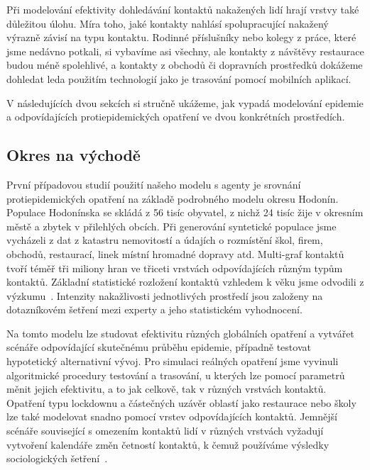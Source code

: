 Při modelování efektivity dohledávání kontaktů nakažených lidí hrají vrstvy také důležitou úlohu. Míra toho, jaké kontakty nahlásí spolupracující nakažený výrazně závisí na typu kontaktu. Rodinné příslušníky nebo kolegy z práce, které jsme nedávno potkali, si vybavíme asi všechny, ale kontakty z návštěvy restaurace budou méně spolehlivé, a kontakty z obchodů či dopravních prostředků dokážeme dohledat leda použitím technologií jako je trasování pomocí mobilních aplikací.

V následujících dvou sekcích si stručně ukážeme, jak vypadá modelování epidemie a odpovídajících protiepidemických opatření ve dvou konkrétních prostředích. 




\subsection*{Okres na východě}

První případovou studií použití našeho modelu s agenty je srovnání protiepidemických opatření na základě podrobného modelu okresu Hodonín. Populace Hodonínska se skládá z 56 tisíc obyvatel, z nichž 24 tisíc žije v okresním městě a zbytek v přilehlých obcích. Při generování syntetické populace jsme vycházeli z dat z katastru nemovitostí a údajích o rozmístění škol, firem, obchodů, restaurací, linek místní hromadné dopravy atd. Multi-graf kontaktů tvoří téměř tři miliony hran ve třiceti vrstvách odpovídajících různým typům kontaktů. Základní statistické rozložení kontaktů vzhledem k věku jsme odvodili z výzkumu~\cite{Prem_etal2017}. Intenzity nakažlivosti jednotlivých prostředí jsou založeny na dotazníkovém šetření mezi experty a jeho statistickém vyhodnocení. 

Na tomto modelu lze studovat efektivitu různých globálních opatření a vytvářet scénáře odpovídající skutečnému průběhu epidemie, případně testovat hypotetický alternativní vývoj. Pro simulaci reálných opatření jsme vyvinuli algoritmické procedury testování a trasování, u kterých lze pomocí parametrů měnit jejich efektivitu, a to jak celkově, tak v různých vrstvách kontaktů. Opatření typu lockdownu a částečných uzávěr oblastí jako restaurace nebo školy lze také modelovat snadno pomocí vrstev odpovídajících kontaktů. Jemnější scénáře související s omezením kontaktů lidí v různých vrstvách vyžadují vytvoření kalendáře změn četností kontaktů, k čemuž používáme výsledky sociologických šetření~\cite{paqcovid}.   

